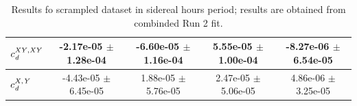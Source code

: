 \begin{table}
\begin{center}
{\begin{tabular}{| l| c| c| c| c|}
                        \hline 
                        $c_{\it d}^{\it XY,XY}$  & -2.17e-05 $\pm$ 1.28e-04 & -6.60e-05 $\pm$ 1.16e-04 & 5.55e-05 $\pm$ 1.00e-04 & -8.27e-06 $\pm$ 6.54e-05\\
                        \hline 
                        $c_{\it d}^{\it X,Y}$  & -4.43e-05 $\pm$ 6.45e-05 & 1.88e-05 $\pm$ 5.76e-05 & 2.47e-05 $\pm$ 5.06e-05 & 4.86e-06 $\pm$ 3.25e-05\\
                        \hline 
                        \hline
                        \end{tabular}
                        }%
                        \end{center}
                        \caption{ Results fo scrampled dataset in sidereal hours period;
                        results are obtained from combinded Run 2 fit.
                       \label{table:scrambled_sidereal}}
\end{table}
                        
                        
            
        
        